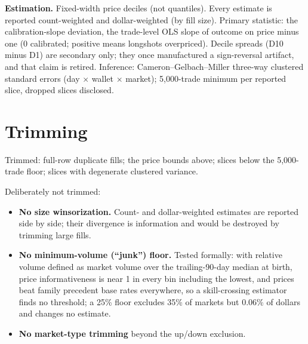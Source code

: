 \documentclass[11pt]{article}
\begin{document}
\textbf{Estimation.} Fixed-width price deciles (not quantiles). Every
estimate is reported count-weighted and dollar-weighted (by fill size).
Primary statistic: the calibration-slope deviation, the trade-level OLS slope
of outcome on price minus one (0 calibrated; positive means longshots
overpriced). Decile spreads (D10 minus D1) are secondary only; they once
manufactured a sign-reversal artifact, and that claim is retired. Inference:
Cameron--Gelbach--Miller three-way clustered standard errors (day $\times$
wallet $\times$ market); 5{,}000-trade minimum per reported slice, dropped
slices disclosed.

\section{Trimming}

Trimmed: full-row duplicate fills; the price bounds above; slices below the
5{,}000-trade floor; slices with degenerate clustered variance.

Deliberately not trimmed:
\begin{itemize}
  \item \textbf{No size winsorization.} Count- and dollar-weighted estimates
  are reported side by side; their divergence is information and would be
  destroyed by trimming large fills.
  \item \textbf{No minimum-volume (``junk'') floor.} Tested formally: with
  relative volume defined as market volume over the trailing-90-day median at
  birth, price informativeness is near 1 in every bin including the lowest,
  and prices beat family precedent base rates everywhere, so a skill-crossing
  estimator finds no threshold; a 25\% floor excludes 35\% of markets but
  0.06\% of dollars and changes no estimate.
  \item \textbf{No market-type trimming} beyond the up/down exclusion.
\end{itemize}
\end{document}

